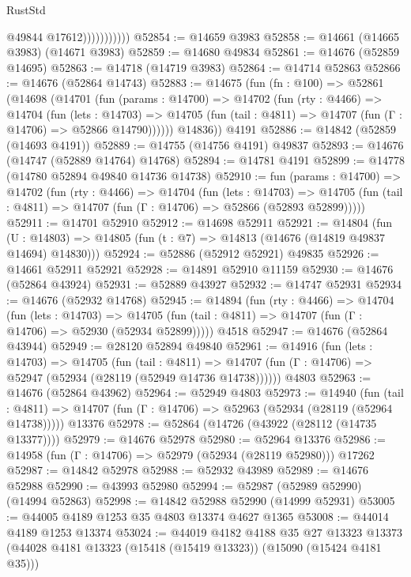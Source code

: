 \begin{lexlean}{RustStd}
\begin{coremodule}
                          @49844
                          @17612)))))))))))
@52854 := @14659 @3983
@52858 := @14661 (@14665 @3983) (@14671 @3983)
@52859 := @14680 @49834
@52861 := @14676 (@52859 @14695)
@52863 := @14718 (@14719 @3983)
@52864 := @14714 @52863
@52866 := @14676 (@52864 @14743)
@52883 := @14675
    (fun (fn : @100) =>
    @52861
      (@14698
        (@14701
          (fun (params : @14700) =>
          @14702
            (fun (rty : @4466) =>
            @14704
              (fun (lets : @14703) =>
              @14705 (fun (tail : @4811) => @14707 (fun (Γ : @14706) => @52866 @14790))))))
        @14836))
    @4191
@52886 := @14842 (@52859 (@14693 @4191))
@52889 := @14755 (@14756 @4191) @49837
@52893 := @14676 (@14747 (@52889 @14764) @14768)
@52894 := @14781 @4191
@52899 := @14778 (@14780 @52894 @49840 @14736 @14738)
@52910 := fun (params : @14700) =>
  @14702
    (fun (rty : @4466) =>
    @14704
      (fun (lets : @14703) =>
      @14705 (fun (tail : @4811) => @14707 (fun (Γ : @14706) => @52866 (@52893 @52899)))))
@52911 := @14701 @52910
@52912 := @14698 @52911
@52921 := @14804
    (fun (U : @14803) => @14805 (fun (t : @7) => @14813 (@14676 (@14819 @49837 @14694) @14830)))
@52924 := @52886 (@52912 @52921) @49835
@52926 := @14661 @52911 @52921
@52928 := @14891 @52910 @11159
@52930 := @14676 (@52864 @43924)
@52931 := @52889 @43927
@52932 := @14747 @52931
@52934 := @14676 (@52932 @14768)
@52945 := @14894
    (fun (rty : @4466) =>
    @14704
      (fun (lets : @14703) =>
      @14705 (fun (tail : @4811) => @14707 (fun (Γ : @14706) => @52930 (@52934 @52899)))))
    @4518
@52947 := @14676 (@52864 @43944)
@52949 := @28120 @52894 @49840
@52961 := @14916
    (fun (lets : @14703) =>
    @14705
      (fun (tail : @4811) =>
      @14707 (fun (Γ : @14706) => @52947 (@52934 (@28119 (@52949 @14736 @14738))))))
    @4803
@52963 := @14676 (@52864 @43962)
@52964 := @52949 @4803
@52973 := @14940
    (fun (tail : @4811) => @14707 (fun (Γ : @14706) => @52963 (@52934 (@28119 (@52964 @14738)))))
    @13376
@52978 := @52864 (@14726 (@43922 (@28112 (@14735 @13377))))
@52979 := @14676 @52978
@52980 := @52964 @13376
@52986 := @14958 (fun (Γ : @14706) => @52979 (@52934 (@28119 @52980))) @17262
@52987 := @14842 @52978
@52988 := @52932 @43989
@52989 := @14676 @52988
@52990 := @43993 @52980
@52994 := @52987 (@52989 @52990) (@14994 @52863)
@52998 := @14842 @52988 @52990 (@14999 @52931)
@53005 := @44005 @4189 @1253 @35 @4803 @13374 @4627 @1365
@53008 := @44014 @4189 @1253 @13374
@53024 := @44019
    @4182
    @4188
    @35
    @27
    @13323
    @13373
    (@44028 @4181 @13323 (@15418 (@15419 @13323)) (@15090 (@15424 @4181 @35)))

\end{coremodule}
\end{lexlean}
